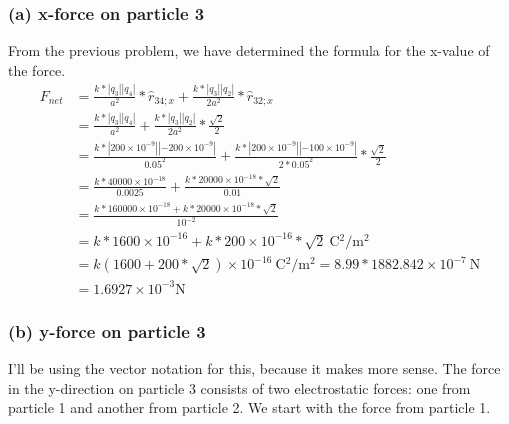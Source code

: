 \documentclass[12pt]{article}
\begin{document}
\subsubsection*{(a) x-force on particle 3}
From the previous problem, we have determined the formula for the x-value of the force.
\begin{align*}
    F_{net} &=  \frac{k*|q_3||q_4|}{a^2}*\hat{r}_{34;x} + \frac{k*|q_3||q_2|}{2a^2}*\hat{r}_{32;x}\\
            &=  \frac{k*|q_3||q_4|}{a^2} + \frac{k*|q_3||q_2|}{2a^2}*\frac{\sqrt{2}}{2}\\
            &=  \frac{k*|200 \times 10^{-9}||-200 \times 10^{-9}|}{0.05^2} + \frac{k*|200 \times 10^{-9}||-100 \times 10^{-9}|}{2*0.05^2}*\frac{\sqrt{2}}{2}\\
            &=  \frac{k*40000 \times 10^{-18}}{0.0025} + \frac{k*20000 \times 10^{-18}*\sqrt{2}}{0.01}\\
            &=  \frac{k*160000 \times 10^{-18} + k*20000 \times 10^{-18}*\sqrt{2}}{10^{-2}}\\
            &=  k*1600 \times 10^{-16} + k*200 \times 10^{-16}*\sqrt{2}\ \unit{\coulomb^2/\meter^2}\\
            &=  k(1600 + 200*\sqrt{2}) \times 10^{-16}\ \unit{\coulomb^2/\meter^2}
            =   8.99*1882.842 \times 10^{-7}\ \unit{\newton}\\
            &=  \boxed{1.6927 \times 10^{-3} \unit{\newton}}
\end{align*}

\subsubsection*{(b) y-force on particle 3}
I'll be using the vector notation for this, because it makes more sense. 
The force in the y-direction on particle 3 consists of two electrostatic forces: one from particle 1 and another from particle 2. We start with the force from particle 1. 




\end{document}

